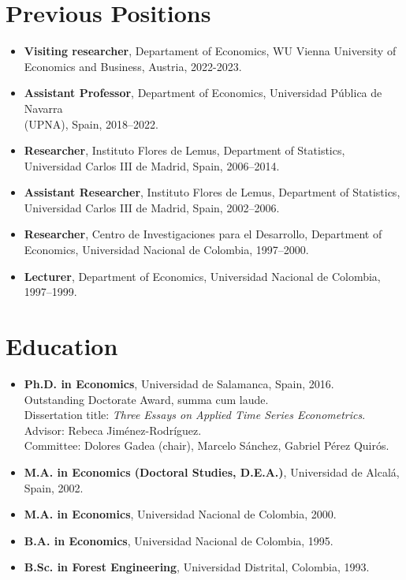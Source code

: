 \documentclass[11pt]{article}\usepackage[]{graphicx}\usepackage[usenames,dvipsnames]{xcolor}
\begin{document}
{\section{Previous Positions} 
\begin{itemize}
  \item\textbf{Visiting researcher}, Departament of Economics, WU Vienna University of Economics and Business, Austria, 2022-2023.\\
  \item\textbf{Assistant Professor}, Department of Economics, Universidad Pública de Navarra\\ (UPNA), Spain, 2018--2022.
  \item \textbf{Researcher}, Instituto Flores de Lemus, Department of Statistics, Universidad Carlos III de Madrid, Spain, 2006--2014.
  \item \textbf{Assistant Researcher}, Instituto Flores de Lemus, Department of Statistics, Universidad Carlos III de Madrid, Spain, 2002--2006.
  \item \textbf{Researcher}, Centro de Investigaciones para el Desarrollo, Department of Economics, Universidad Nacional de Colombia, 1997--2000.
  \item \textbf{Lecturer}, Department of Economics, Universidad Nacional de Colombia, 1997--1999.
\end{itemize}

\section{Education}
\begin{itemize}
  \item {\textbf{Ph.D. in Economics}, Universidad de Salamanca, Spain, 2016.\\
  Outstanding Doctorate Award, summa cum laude.\\
  Dissertation title: \emph{Three Essays on Applied Time Series Econometrics}.\\
  Advisor: Rebeca Jiménez-Rodríguez.\\
  Committee: Dolores Gadea (chair), Marcelo Sánchez, Gabriel Pérez Quirós.}
  \item \textbf{M.A. in Economics (Doctoral Studies, D.E.A.)}, Universidad de Alcalá, Spain, 2002.
  \item \textbf{M.A. in Economics}, Universidad Nacional de Colombia, 2000.
  \item \textbf{B.A. in Economics}, Universidad Nacional de Colombia, 1995.
  \item \textbf{B.Sc. in Forest Engineering}, Universidad Distrital, Colombia, 1993.
\end{itemize}

}
\end{document}
